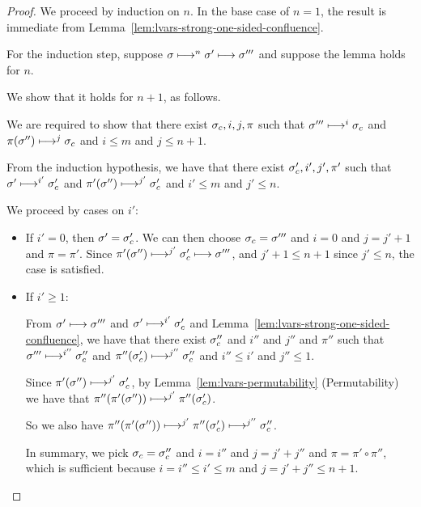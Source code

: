 \begin{proof}
  We proceed by induction on $n$.  In the base case of $n = 1$, the
  result is immediate from
  Lemma~\ref{lem:lvars-strong-one-sided-confluence}.

  For the induction step, suppose $\sigma \longmapsto^n \sigma'
  \longmapsto \sigma'''$ and suppose the lemma holds for $n$.

  We show that it holds for $n + 1$, as follows.

  We are required to show that there exist $\sigma_c, i, j, \pi$ such
  that $\sigma''' \longmapsto^i \sigma_c$ and $\pi(\sigma'')
  \longmapsto^j \sigma_c$ and $i \leq m$ and $j \leq n + 1$.

  From the induction hypothesis, we have that there exist $\sigma'_c,
  i', j', \pi'$ such that $\sigma' \longmapsto^{i'} \sigma'_c$ and
  $\pi'(\sigma'') \longmapsto^{j'} \sigma'_c$ and $i' \leq m$ and $j'
  \leq n$.

  We proceed by cases on $i'$:
  \begin{itemize}

  \item If $i' = 0$, then $\sigma' = \sigma_c'$.  We can then choose
    $\sigma_c = \sigma'''$ and $i = 0$ and $j = j' + 1$ and $\pi =
    \pi'$.  Since $\pi'(\sigma'') \longmapsto^{j'} \sigma'_c \longmapsto
    \sigma'''$, and $j' + 1 \leq n + 1$ since $j' \leq n$, the case is
    satisfied.

  \item If $i' \geq 1$:

    From $\sigma' \longmapsto \sigma'''$ and $\sigma' \longmapsto^{i'}
    \sigma_c'$ and Lemma~\ref{lem:lvars-strong-one-sided-confluence},
    we have that there exist $\sigma_c''$ and $i''$ and $j''$ and
    $\pi''$ such that $\sigma''' \longmapsto^{i''} \sigma_c''$ and
    $\pi''(\sigma_c') \longmapsto^{j''} \sigma_c''$ and $i'' \leq i'$
    and $j'' \leq 1$.

    Since $\pi'(\sigma'') \longmapsto^{j'} \sigma'_c$, by
    Lemma~\ref{lem:lvars-permutability} (Permutability) we have that
    $\pi''(\pi'(\sigma'')) \longmapsto^{j'} \pi''(\sigma'_c)$.

    So we also have $\pi''(\pi'(\sigma'')) \longmapsto^{j'}
    \pi''(\sigma'_c) \longmapsto^{j''} \sigma_c''$.

    In summary, we pick $\sigma_c = \sigma_c''$ and $i = i''$ and $j =
    j' + j''$ and $\pi = \pi' \circ \pi''$, which is sufficient
    because $i = i'' \leq i' \leq m$ and $j = j' + j'' \leq n + 1$.
  \end{itemize}

\end{proof}
